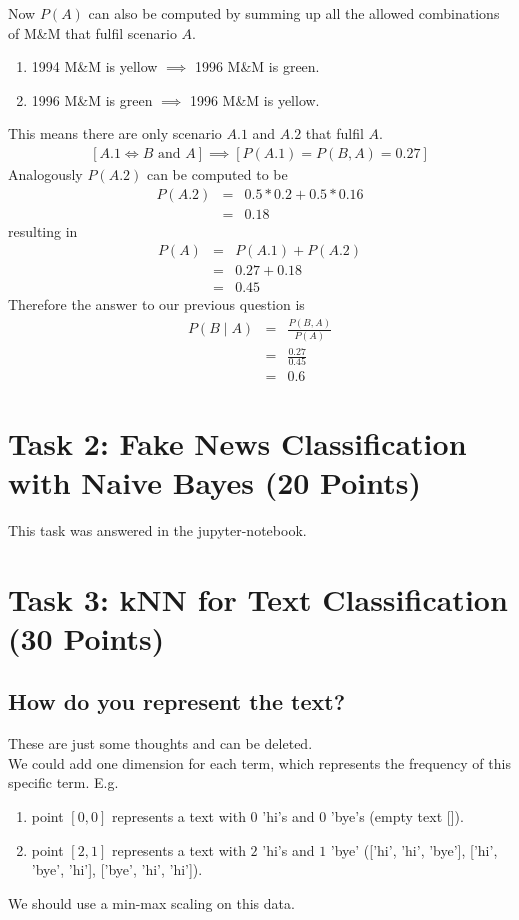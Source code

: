 \documentclass{article}
\begin{document}
	Now $P(A)$ can also be computed by summing up all the allowed combinations of M\&M that fulfil scenario $A$.\\
	\begin{enumerate}[label=A.\arabic*]
		\item 1994 M\&M is yellow $\implies$ 1996 M\&M is green.
		\item 1996 M\&M is green $\implies$ 1996 M\&M is yellow.
	\end{enumerate}
	This means there are only scenario $A.1$ and $A.2$ that fulfil $A$.
	\begin{eqnarray*}
		\left[A.1 \Leftrightarrow B \text{ and } A\right] \implies \left[P(A.1) = P(B, A) = 0.27\right]
	\end{eqnarray*}
	Analogously $P(A.2)$ can be computed to be
	\begin{eqnarray*}
		P(A.2) &=& 0.5 * 0.2 + 0.5 * 0.16\\
		&=& 0.18
	\end{eqnarray*}
	resulting in
	\begin{eqnarray*}
		P(A) &=& P(A.1) + P(A.2)\\
		&=& 0.27 + 0.18\\
		&=& 0.45
	\end{eqnarray*}
	Therefore the answer to our previous question is
	\begin{eqnarray*}
		P(B \mid A) &=& \frac{P(B, A)}{P(A)}\\
		&=& \frac{0.27}{0.45}\\
		&=& 0.6
	\end{eqnarray*}
\section{Task 2: Fake News Classification with Naive Bayes (20 Points)}
	This task was answered in the jupyter-notebook.
\section{Task 3: kNN for Text Classification (30 Points)}
	\subsection{How do you represent the text?}
	These are just some thoughts and can be deleted.\\
	We could add one dimension for each term, which represents the frequency of this specific term. E.g.
	\begin{enumerate}[label=-]
		\item point $[0, 0]$ represents a text with $0$ 'hi's and $0$ 'bye's (empty text []).
		\item point $[2, 1]$ represents a text with $2$ 'hi's and $1$ 'bye' (['hi', 'hi', 'bye'], ['hi', 'bye', 'hi'], ['bye', 'hi', 'hi']).
	\end{enumerate}
	We should use a min-max scaling on this data.
\end{document}
